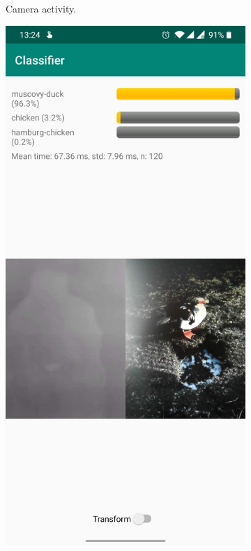 \documentclass{l4proj}
\begin{document}
\begin{appendices}
\begin{figure}[ht]
\begin{subfigure}[h!]{0.32\textwidth}
    \caption{Camera activity.}
    \label{fig:app_activities_camera}
  \end{subfigure}
  \begin{subfigure}[h!]{0.32\textwidth}
    \includegraphics[width=\textwidth]{images/app/screenshot_0.jpg}

\end{subfigure}
\end{figure}
\end{appendices}
\end{document}
